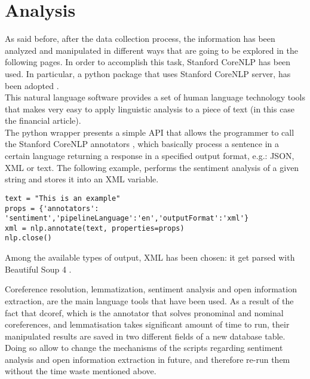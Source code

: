 \section{Analysis}
As said before, after the data collection process, the information has been analyzed and manipulated in different ways that are going to be explored in the following pages. In order to accomplish this task,
Stanford CoreNLP \cite{stanfordcorenlp} has been used. In particular, a python package that uses Stanford CoreNLP server, has been adopted \cite{corenlpwrapper}. \\
This natural language software provides a set of human language technology tools that makes very easy to apply linguistic analysis to a piece of text (in this case the financial article). \\
The python wrapper presents a simple API that allows the programmer to call the Stanford CoreNLP annotators \cite{annotators}, which basically process a sentence in a certain language returning a response in a specified output format, e.g.: JSON, XML or text. The following example, performs the sentiment analysis of a given string and stores it into an XML variable.
\begin{verbatim}
text = "This is an example"
props = {'annotators': 'sentiment','pipelineLanguage':'en','outputFormat':'xml'}
xml = nlp.annotate(text, properties=props)
nlp.close()
\end{verbatim}
Among the available types of output, XML has been chosen: it get parsed with Beautiful Soup 4 \cite{bs4}. \par 
Coreference resolution, lemmatization, sentiment analysis and open information extraction, are the main language tools that have been used. As a result of the fact that dcoref, which is the annotator that solves pronominal and nominal coreferences, and lemmatisation takes significant amount of time to run, their manipulated results are saved in two different fields of a new database table. Doing so allow to change the mechanisms of the scripts regarding sentiment analysis and open information extraction in future, and therefore re-run them without the time waste mentioned above.



